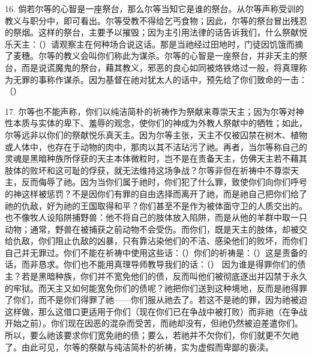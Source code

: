 16. 倘若尔等的心智是一座祭台，那么尔等当知它是谁的祭台。从尔等声称受训的教义与职分中，即可看出。尔等受教不得给乞丐食物；因此，尔等的祭台冒出残忍的祭烟。这样的祭台，主要予以摧毁；因为主引用法律的话告诉我们，什么祭献悦乐天主：（）请观察主在何种场合说这话。那是当祂经过田地时，门徒因饥饿而摘了麦穗。尔等的教义会叫你们称此为谋杀。尔等的心智是一座祭台，并非天主的祭台，而是说谎魔鬼的祭台，藉其教义，邪恶的良心如同被烙铁烙过一般，将真理称为无罪的事称作谋杀。因为基督在祂对犹太人的话中，预先给了你们致命的一击：（）\par

17. 尔等也不能声称，你们以纯洁简朴的祈祷作为祭献来尊崇天主；因为尔等对神性本质与实体的卑下、羞辱的观念，使你们的神成为外教人祭献中的牺牲；如此，尔等远非以你们的祭献悦乐真天主。因为尔等主张，天主不仅被囚禁在树木、植物或人体中，也存在于动物的肉中，那肉以其不洁玷污了祂。再者，当尔等称自己的灵魂是黑暗种族所俘获的天主本体微粒时，岂不是在责备天主，仿佛天主若不藉其肢体的败坏和这可耻的俘获，就无法维持这场争战？尔等非但在祈祷中不尊崇天主，反而侮辱了祂。因为当你们属于祂时，你们犯了什么罪，致使你们向你们呼号的神这样被惩罚？不是因你们有罪的自由选择而离开了祂，而是祂自己把你们给了祂的仇敌，好为祂的王国取得和平？你们甚至不是作为被体面守卫的人质交出的。也不像牧人设陷阱捕野兽：他不将自己的肢体放入陷阱，而是从他的羊群中取一只动物；通常，野兽在被捕获之前动物不会受伤。而你们，既是天主的肢体，却被交给仇敌，你们阻止仇敌的凶暴，只有靠沾染他们的不洁、感染他们的败坏，而你们自己并无罪过。你们不能在祈祷中使用这些话：（）你们的祈祷是：（）这是责备的话，而非恳求。你们也不能用真理导师教导我们的话：（） 因为谁是得罪你们的债主？若是黑暗种族，你们并不宽免他们的债，反而叫他们被彻底逐出并囚禁于永久的牢狱。而天主又如何能宽免你们的债呢？祂把你们送到这种境地，反而是祂得罪了你们，而不是你们得罪了祂——你们服从祂去了。若这不是祂的罪，因为祂被迫这样做，那么这借口更适用于你们（现在你们已在争战中被打败）而非祂（在争战开始之前）。你们现在因恶的混杂而受苦，而祂却没有，但祂仍然被迫差遣你们。所以，要么祂该要求你们宽免祂的债；要么，若祂并不欠你们，你们就更不欠祂了。由此可见，尔等的祭献与纯洁简朴的祈祷，实为虚假而卑鄙的亵渎。\par

